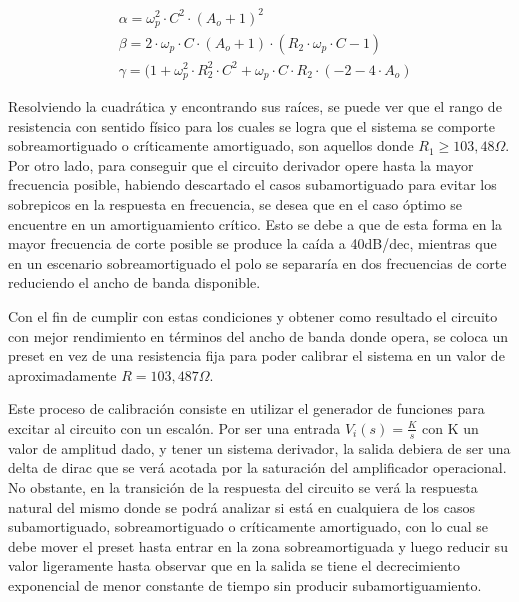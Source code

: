 \begin{align*}
	& \alpha = \omega_p^{2} \cdot C^{2} \cdot (A_o+1)^{2} \\
	& \beta = 2 \cdot \omega_p \cdot C \cdot ( A_o + 1 ) \cdot (R_2 \cdot \omega_p \cdot C - 1) \\
	& \gamma = (1 + \omega_p^{2} \cdot R_2^{2} \cdot C^{2} + \omega_p \cdot C \cdot R_2 \cdot(- 2 - 4 \cdot A_o)
\end{align*}

Resolviendo la cuadr\'atica y encontrando sus ra\'ices, se puede ver que el rango de resistencia con sentido f\'isico para los cuales se logra que el sistema se comporte sobreamortiguado o cr\'iticamente amortiguado, son aquellos donde $R_1 \geqslant 103,48 \Omega$. Por otro lado, para conseguir que el circuito derivador opere hasta la mayor frecuencia posible, habiendo descartado el casos subamortiguado para evitar los sobrepicos en la respuesta en frecuencia, se desea que en el caso \'optimo se encuentre en un amortiguamiento cr\'itico. Esto se debe a que de esta forma en la mayor frecuencia de corte posible se produce la ca\'ida a 40dB/dec, mientras que en un escenario sobreamortiguado el polo se separar\'ia en dos frecuencias de corte reduciendo el ancho de banda disponible.

Con el fin de cumplir con estas condiciones y obtener como resultado el circuito con mejor rendimiento en t\'erminos del ancho de banda donde opera, se coloca un preset en vez de una resistencia fija para poder calibrar el sistema en un valor de aproximadamente $R = 103,487 \Omega$. 

Este proceso de calibraci\'on consiste en utilizar el generador de funciones para excitar al circuito con un escal\'on. Por ser una entrada $V_i(s) = \frac{K}{s}$ con K un valor de amplitud dado, y tener un sistema derivador, la salida debiera de ser una delta de dirac que se ver\'a acotada por la saturaci\'on del amplificador operacional. No obstante, en la transici\'on de la respuesta del circuito se ver\'a la respuesta natural del mismo donde se podr\'a analizar si est\'a en cualquiera de los casos subamortiguado, sobreamortiguado o cr\'iticamente amortiguado, con lo cual se debe mover el preset hasta entrar en la zona sobreamortiguada y luego reducir su valor ligeramente hasta observar que en la salida se tiene el decrecimiento exponencial de menor constante de tiempo sin producir subamortiguamiento.

